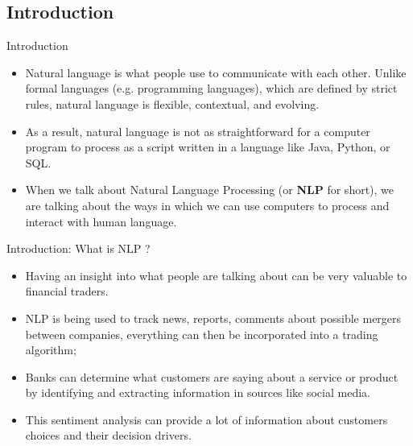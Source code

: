 \documentclass[11pt]{beamer}
\begin{document}
\subsection{Introduction	 \\ \scalebox{0.8}{What is NPL (Natural Language Processing)?}}
\begin{frame}{Introduction	}
	\begin{itemize}
		\item Natural language is what people use to communicate with each other. Unlike formal languages (e.g. programming languages), which are defined by strict rules, natural language is flexible, contextual, and evolving. 
		\item As a result, natural language is not as straightforward for a computer program to process as a script written in a language like Java, Python, or SQL. 
		\item When we talk about Natural Language Processing (or \textbf{NLP} for short), we are talking about the ways in which we can use computers to process and interact with human language.
	\end{itemize}
\end{frame}
\begin{frame}{Introduction: What is NLP ?}
	\begin{itemize}
		\item Having an insight into what people are talking about can be very valuable to financial traders. 
		\item NLP is being used to track news, reports, comments about possible mergers between companies, everything can then be  incorporated into a trading algorithm;
		\item Banks can determine what customers are saying about a service or product by identifying and extracting information in sources like social media. 
		\item This sentiment analysis can provide a lot of information about customers choices and their decision drivers.
	\end{itemize}
\end{frame}
\end{document}

